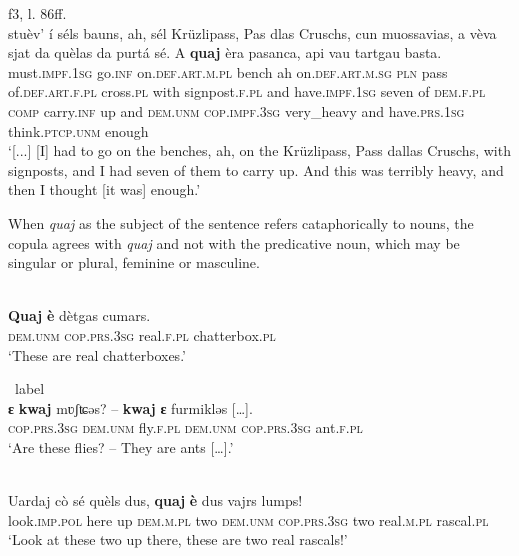  {f3, l. 86ff.}\\
\gll [...] stuèv’ í  séls bauns, ah, sél Krüzlipass, Pas dlas Cruschs, cun muossavias, a vèva sjat da quèlas da purtá sé.  A \textbf{quaj} èra pasanca, api vau tartgau basta.  \\
{} must.\textsc{impf.1sg} go.\textsc{inf} on.\textsc{def.art.m.pl} bench ah on.\textsc{def.art.m.sg} \textsc{pln} pass of.\textsc{def.art.f.pl} cross.\textsc{pl} with signpost.\textsc{f.pl} and have.\textsc{impf.1sg} seven of  \textsc{dem.f.pl} \textsc{comp} carry.\textsc{inf} up and \textsc{dem.unm} \textsc{cop.impf.3sg} very\_heavy and have.\textsc{prs.1sg} think.\textsc{ptcp.unm} enough \\
\glt `[...] [I] had to go on the benches, ah, on the Krüzlipass, Pass dallas Cruschs, with signposts, and I had seven of them to carry up. And this was terribly heavy, and then I thought [it was] enough.'
\z

When \textit{quaj} as the subject of the sentence refers cataphorically to nouns, the copula agrees with \textit{quaj} and not with the predicative noun, which may be singular or plural, feminine or masculine.

\ea
\label{ex:quaj:agrwithsubj}
\\
\gll \textbf{Quaj} \textbf{è} dètgas cumars.\\
\textsc{dem.unm} \textsc{cop.prs.3sg} real.\textsc{f.pl} chatterbox.\textsc{pl}\\
\glt `These are real chatterboxes.'
\z

\ea\
label{}
\\
\gll \textbf{ɛ} \textbf{kwaj} mʋʃʨəs? – \textbf{kwaj} \textbf{ɛ} furmikləs […].\\
     \textsc{cop.prs.3sg} \textsc{dem.unm} fly.\textsc{f.pl} \textsc{}  \textsc{dem.unm} \textsc{cop.prs.3sg} ant.\textsc{f.pl}\\
\glt `Are these flies? – They are ants […].'
\z

\ea

\\
\gll Uardaj cò sé quèls dus, \textbf{quaj} \textbf{è} dus vajrs lumps!\\
     look.\textsc{imp.pol} here up \textsc{dem.m.pl} two \textsc{dem.unm} \textsc{cop.prs.3sg} two real.\textsc{m.pl} rascal.\textsc{pl}  \\
\glt `Look at these two up there, these are two real rascals!'
\z

